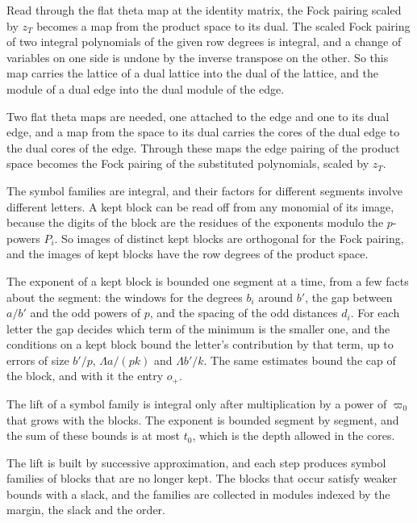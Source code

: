 Read through the flat theta map at the identity matrix, the Fock pairing scaled by $z_T$ becomes a map from the product
space to its dual. The scaled Fock pairing of two integral polynomials of the given row degrees is integral, and a change
of variables on one side is undone by the inverse transpose on the other. So this map carries the lattice of a dual lattice
into the dual of the lattice, and the module of a dual edge into the dual module of the edge.

Two flat theta maps are needed, one attached to the edge and one to its dual edge, and a map from the space to its dual
carries the cores of the dual edge to the dual cores of the edge. Through these maps the edge pairing of the product space
becomes the Fock pairing of the substituted polynomials, scaled by $z_T$.

The symbol families are integral, and their factors for different segments involve different letters. A kept block can be
read off from any monomial of its image, because the digits of the block are the residues of the exponents modulo the
$p$-powers $P_i$. So images of distinct kept blocks are orthogonal for the Fock pairing, and the images of kept blocks have
the row degrees of the product space.

The exponent of a kept block is bounded one segment at a time, from a few facts about the segment: the windows for the
degrees $b_i$ around $b'$, the gap between $a/b'$ and the odd powers of $p$, and the spacing of the odd distances $d_i$. For
each letter the gap decides which term of the minimum is the smaller one, and the conditions on a kept block bound the
letter's contribution by that term, up to errors of size $b'/p$, $\Lambda a/(pk)$ and $\Lambda b'/k$. The same estimates
bound the cap of the block, and with it the entry $o_+$.

The lift of a symbol family is integral only after multiplication by a power of $\varpi_0$ that grows with the blocks. The
exponent is bounded segment by segment, and the sum of these bounds is at most $t_0$, which is the depth allowed in the
cores.

The lift is built by successive approximation, and each step produces symbol families of blocks that are no longer kept.
The blocks that occur satisfy weaker bounds with a slack, and the families are collected in modules indexed by the margin,
the slack and the order.

